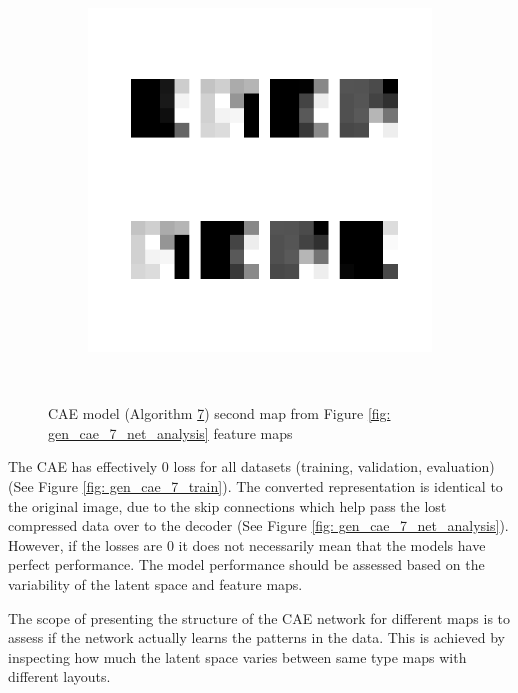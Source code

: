 \begin{figure}
\begin{subfigure}[b]{0.4\linewidth}
    \end{subfigure}
    \hfill
    \begin{subfigure}[b]{0.4\linewidth}
        \includegraphics[width=\linewidth]{images/cae_online_lstm/caelstm_section_cae_training_block_map_10000_model_feature_maps_map_1_0_0.png}
    \end{subfigure}
    \\[-0.5cm]
    \caption{CAE model (Algorithm \hyperref[tab: evalalgorithms]{7}) second map from Figure \ref{fig: gen_cae_7_net_analysis} feature maps}
    \label{fig: gen_cae_7_feature_maps_2}
\end{figure}

\FloatBarrier

The CAE has effectively 0 loss for all datasets (training, validation, evaluation) (See Figure \ref{fig: gen_cae_7_train}). The converted representation is identical to the original image, due to the skip connections which help pass the lost compressed data over to the decoder (See Figure \ref{fig: gen_cae_7_net_analysis}). However, if the losses are 0 it does not necessarily mean that the models have perfect performance. The model performance should be assessed based on the variability of the latent space and feature maps.

The scope of presenting the structure of the CAE network for different maps is to assess if the network actually learns the patterns in the data. This is achieved by inspecting how much the latent space varies between same type maps with different layouts. 

